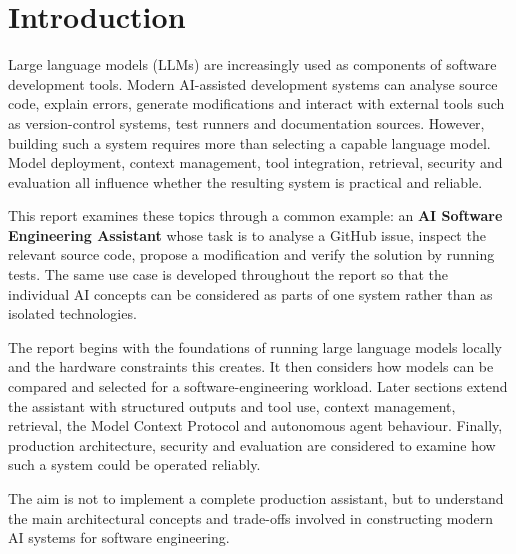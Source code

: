 \chapter{Introduction}
\label{chap:introduction}

Large language models (LLMs) are increasingly used as components of software development tools. Modern AI-assisted development systems can analyse source code, explain errors, generate modifications and interact with external tools such as version-control systems, test runners and documentation sources. However, building such a system requires more than selecting a capable language model. Model deployment, context management, tool integration, retrieval, security and evaluation all influence whether the resulting system is practical and reliable.

This report examines these topics through a common example: an \textbf{AI Software Engineering Assistant} whose task is to analyse a GitHub issue, inspect the relevant source code, propose a modification and verify the solution by running tests. The same use case is developed throughout the report so that the individual AI concepts can be considered as parts of one system rather than as isolated technologies.

The report begins with the foundations of running large language models locally and the hardware constraints this creates. It then considers how models can be compared and selected for a software-engineering workload. Later sections extend the assistant with structured outputs and tool use, context management, retrieval, the Model Context Protocol and autonomous agent behaviour. Finally, production architecture, security and evaluation are considered to examine how such a system could be operated reliably.

The aim is not to implement a complete production assistant, but to understand the main architectural concepts and trade-offs involved in constructing modern AI systems for software engineering.

